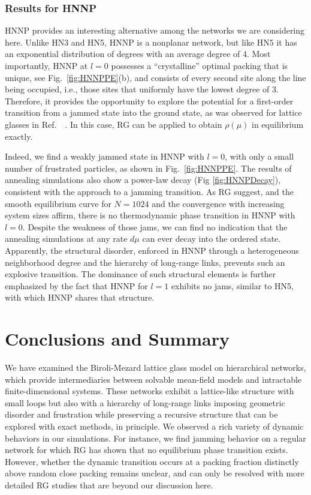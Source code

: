 \subsubsection{Results for HNNP}

\label{subsec:HNNP}

HNNP provides an interesting alternative among the networks we are
considering here. Unlike HN3 and HN5, HNNP is a nonplanar network,
but like HN5 it has an exponential distribution of degrees with an
average degree of 4. Most importantly, HNNP at $l=0$ possesses a
``crystalline'' optimal packing that is unique, see Fig.~\ref{fig:HNNPPE}(b),
and consists of every second site along the line being occupied, i.e.,
those sites that uniformly have the lowest degree of 3. Therefore,
it provides the opportunity to explore the potential for a first-order
transition from a jammed state into the ground state, as was observed
for lattice glasses in Ref.~~\cite{Biroli02}. In this case, RG can
be applied to obtain $\rho(\mu)$ in equilibrium exactly.

Indeed, we find a weakly jammed state in HNNP with $l=0$, with only
a small number of frustrated particles, as shown in Fig.~\ref{fig:HNNPPE}.
The results of annealing simulations also show a power-law decay (Fig
\ref{fig:HNNPDecay}), consistent with the approach to a jamming transition.
As RG suggest, and the smooth equilibrium curve for $N=1024$ and
the convergence with increasing system sizes affirm, there is no thermodynamic
phase transition in HNNP with $l=0$. Despite the weakness of those
jams, we can find no indication that the annealing simulations at
any rate $d\mu$ can ever decay into the ordered state. Apparently,
the structural disorder, enforced in HNNP through a heterogeneous
neighborhood degree and the hierarchy of long-range links, prevents
such an explosive transition. The dominance of such structural elements
is further emphasized by the fact that HNNP for $l=1$ exhibits no
jams, similar to HN5, with which HNNP shares that structure. 


\section{Conclusions and Summary}

\label{sec:jam_conclusions}

We have examined the Biroli-Mezard lattice glass model on hierarchical
networks, which provide intermediaries between solvable mean-field
models and intractable finite-dimensional systems. These networks
exhibit a lattice-like structure with small loops but also with a hierarchy of long-range links
imposing geometric disorder and frustration while preserving a recursive
structure that can be explored with exact methods, in principle. We
observed a rich variety of dynamic behaviors in our simulations. For
instance, we find jamming behavior on a regular network for which
RG has shown that no equilibrium phase transition exists. However,
whether the dynamic transition occurs at a packing fraction distinctly
above random close packing remains unclear, and can only be resolved
with more detailed RG studies that are beyond our discussion here.

